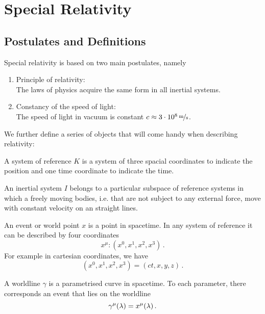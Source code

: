 \chapter{Special Relativity}
\section{Postulates and Definitions}
Special relativity is based on two main postulates, namely
\begin{enumerate}
    \item Principle of relativity: \\
    The laws of physics acquire the same form in all inertial systems.
    \item Constancy of the speed of light:\\
    The speed of light in vacuum is constant ${c\approx\unitfrac[3\cdot
    10^8]{m}{s}}$.
\end{enumerate}
We further define a series of objects that will come handy when describing
relativity:
\begin{definition}
    A system of reference $K$ is a system of three spacial coordinates to indicate
    the position and one time coordinate to indicate the time.
\end{definition}
\begin{definition}
    An inertial system $I$ belongs to a particular subspace of reference systems in
    which a freely moving bodies, i.e. that are not subject to any external
    force, move with constant velocity on an straight lines.
\end{definition}
\begin{definition}[Event]
    An event or world point $x$ is a point in spacetime. In any system of reference
    it can be described by four coordinates
    \begin{equation}
        x^\mu: (x^0,x^1,x^2,x^3)\, .
    \end{equation}
    For example in cartesian coordinates, we have
    \begin{equation}
        (x^0,x^1,x^2,x^3) = (ct,x,y,z)\, .
    \end{equation}
\end{definition}
\begin{definition}[Worldline]
    A worldline $\gamma$ is a parametrised curve in spacetime. To each parameter,
    there corresponds an event that lies on the worldline
    \begin{equation}
        \tensor{\gamma}{^\mu}(\lambda)=\tensor{x}{^\mu}(\lambda)\, .
    \end{equation}
\end{definition}
